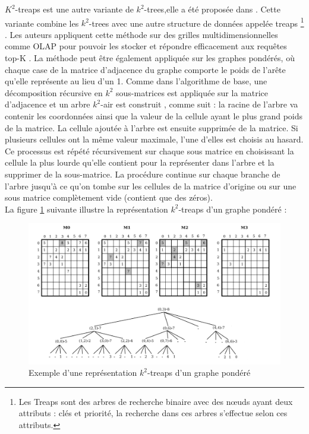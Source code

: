 $K^2$-treaps est une autre variante de $k^2$-trees,elle a été proposée dans \citep{brisaboa2014k}. Cette variante combine les $k^2$-trees avec une autre structure de données appelée treaps \footnote{Les Treaps sont des arbres de recherche binaire avec des nœuds ayant deux attributs : clés et priorité, la recherche dans ces arbres s'effectue selon ces attributs.} \citep{aragon1989randomized}. Les auteurs appliquent cette méthode sur des grilles multidimensionnelles comme OLAP pour pouvoir les stocker et répondre efficacement aux requêtes top-K \citep{badr2013traitement}. La méthode peut être également appliquée sur les graphes pondérés, où chaque case de la matrice d'adjacence du graphe comporte le poids de l'arête qu'elle représente au lieu d'un 1.
Comme dans l'algorithme de base, une décomposition récursive en $k^2$ sous-matrices est appliquée sur la matrice d'adjacence et un arbre $k^2$-air est construit , comme suit : la racine de l'arbre va contenir les coordonnées ainsi que la valeur de la cellule ayant le plus grand poids de la matrice. La cellule ajoutée à l'arbre est ensuite supprimée de la matrice. Si plusieurs cellules ont la même valeur maximale, l'une d'elles est choisis au hasard. Ce processus est répété récursivement sur chaque sous matrice en choisissant la cellule la plus lourde qu'elle contient pour la représenter dans l'arbre et la supprimer de la sous-matrice. La procédure continue sur chaque branche de l'arbre jusqu'à ce qu'on tombe sur les cellules de la matrice d'origine ou sur une sous matrice complètement vide (contient que des zéros).\\
La figure \ref{k2-treaps} suivante illustre la représentation $k^2$-treaps d'un graphe pondéré \citep{badr2013traitement} :

\begin{figure}[H]
\begin{center}
\includegraphics[height=200 pt, width=380 pt]{./ressources/image/k2-treaps.png} 
\end{center}
\caption{Exemple d'une représentation $k^2$-treaps d'un graphe pondéré}
\label{k2-treaps}
\end{figure}

